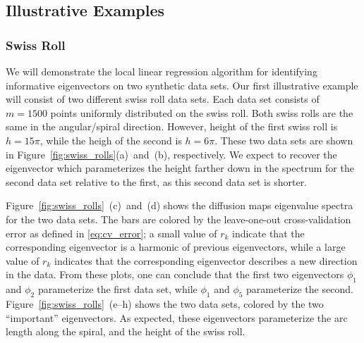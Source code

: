 \documentclass[preprint]{elsarticle}
\begin{document}
\subsection{Illustrative Examples}

\subsubsection{Swiss Roll}

We will demonstrate the local linear regression algorithm for identifying informative eigenvectors on two synthetic data sets. 
%
Our first illustrative example will consist of two different swiss roll data sets.
%
Each data set consists of $m=1500$ points uniformly distributed on the swiss roll. 
%
Both swiss rolls are the same in the angular/spiral direction.
%
However, height of the first swiss roll is $h = 15 \pi$, while the heigh of the second is $h = 6 \pi$. 
%
These two data sets are shown in Figure~\ref{fig:swiss_rolls}(a)~and~(b), respectively.
%
We expect to recover the eigenvector which parameterizes the height farther down in the spectrum for the second data set relative to the first, as this second data set is shorter.

Figure~\ref{fig:swiss_rolls}~(c)~and~(d) shows the diffusion maps eigenvalue spectra for the two data sets.
%
The bars are colored by the leave-one-out cross-validation error as defined in \eqref{eq:cv_error}; a small value of $r_k$ indicate that the corresponding eigenvector is a harmonic of previous eigenvectors, while a large value of $r_k$ indicates that the corresponding eigenvector describes a new direction in the data. 
%
From these plots, one can conclude that the first two eigenvectors $\phi_1$ and $\phi_2$ parameterize the first data set, while $\phi_1$ and $\phi_5$ parameterize the second. 
%
Figure~\ref{fig:swiss_rolls}~(e--h) shows the two data sets, colored by the two ``important'' eigenvectors. 
%
As expected, these eigenvectors parameterize the arc length along the spiral, and the height of the swiss roll. 
\end{document}
